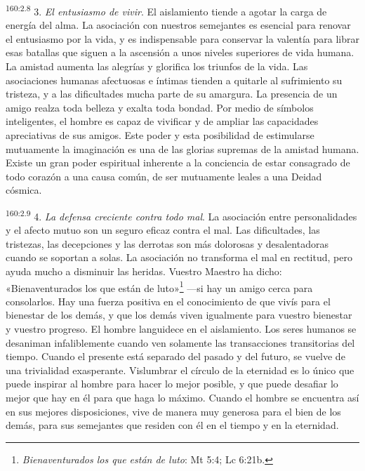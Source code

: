 \par
\textsuperscript{160:2.8} 3. \textit{El entusiasmo de vivir}. El aislamiento tiende a agotar la carga de energía del alma. La asociación con nuestros semejantes es esencial para renovar el entusiasmo por la vida, y es indispensable para conservar la valentía para librar esas batallas que siguen a la ascensión a unos niveles superiores de vida humana. La amistad aumenta las alegrías y glorifica los triunfos de la vida. Las asociaciones humanas afectuosas e íntimas tienden a quitarle al sufrimiento su tristeza, y a las dificultades mucha parte de su amargura. La presencia de un amigo realza toda belleza y exalta toda bondad. Por medio de símbolos inteligentes, el hombre es capaz de vivificar y de ampliar las capacidades apreciativas de sus amigos. Este poder y esta posibilidad de estimularse mutuamente la imaginación es una de las glorias supremas de la amistad humana. Existe un gran poder espiritual inherente a la conciencia de estar consagrado de todo corazón a una causa común, de ser mutuamente leales a una Deidad cósmica.

\par
\textsuperscript{160:2.9} 4. \textit{La defensa creciente contra todo mal}. La asociación entre personalidades y el afecto mutuo son un seguro eficaz contra el mal. Las dificultades, las tristezas, las decepciones y las derrotas son más dolorosas y desalentadoras cuando se soportan a solas. La asociación no transforma el mal en rectitud, pero ayuda mucho a disminuir las heridas. Vuestro Maestro ha dicho: «Bienaventurados los que están de luto»\footnote{\textit{Bienaventurados los que están de luto}: Mt 5:4; Lc 6:21b.} ---si hay un amigo cerca para consolarlos. Hay una fuerza positiva en el conocimiento de que vivís para el bienestar de los demás, y que los demás viven igualmente para vuestro bienestar y vuestro progreso. El hombre languidece en el aislamiento. Los seres humanos se desaniman infaliblemente cuando ven solamente las transacciones transitorias del tiempo. Cuando el presente está separado del pasado y del futuro, se vuelve de una trivialidad exasperante. Vislumbrar el círculo de la eternidad es lo único que puede inspirar al hombre para hacer lo mejor posible, y que puede desafiar lo mejor que hay en él para que haga lo máximo. Cuando el hombre se encuentra así en sus mejores disposiciones, vive de manera muy generosa para el bien de los demás, para sus semejantes que residen con él en el tiempo y en la eternidad.

